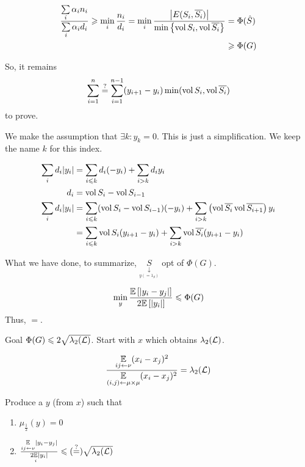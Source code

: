 \[
    \begin{aligned}
        \frac{\sum\limits_i \alpha_i n_i}{\sum\limits_i \alpha_i d_i} \geqslant \min\limits_i \frac{n_i}{d_i} = \min_i \frac{\left\lvert E(S_i,\overline{S_i})\right\rvert}{\min\left\{ \operatorname{vol} S_i,\operatorname{vol} \overline{S_i} \right\}} &= \Phi(\hat{S})\\
        &\geqslant \Phi(G)
    \end{aligned}
\]

So, it remains 
\[
    \sum\limits_{i=1}^n \overset{?}{=} \sum\limits_{i=1}^{n-1} (y_{i+1} - y_i) \min(\operatorname{vol} S_i, \operatorname{vol} \overline{S_i})
\]
to prove.



We make the assumption that $\exists k : y_k = 0$. This is just a simplification. We keep the name $k$ for this index.

\[
    \begin{aligned}
        \sum\limits_i d_i\lvert y_i \rvert &= \sum\limits_{i\leqslant k} d_i(-y_i) + \sum\limits_{i > k}d_i y_i\\
       d_i &= \operatorname{vol} S_i - \operatorname{vol} S_{i-1}\\
       \sum\limits_i d_i\lvert y_i \rvert &= \sum\limits_{i\leqslant k} (\operatorname{vol} S_i - \operatorname{vol} S_{i-1})(-y_i) + \sum\limits_{i>k} \left(\operatorname{vol} \overline{S_i} \operatorname{vol} \overline{S_{i+1}} \right)y_i\\
       &= \sum\limits_{i\leqslant k} \operatorname{vol} S_i (y_{i+1} -y_i) + \sum\limits_{i>k} \operatorname{vol} \overline{S_i} (y_{i+1} - y_i)
    \end{aligned}
\]

What we have done, to summarize, $\underset{\underset{y(=1_S)}{\downarrow}}{S}$ opt of $\Phi(G)$.

\[
    \min\limits_y \frac{\mathbb{E}\left[ \lvert y_i-y_j\rvert \right]}{2\mathbb{E}\left[ \lvert y_i \rvert \right]} \leqslant \Phi(G)
\]
Thus, $=$.

Goal $\Phi(G) \leqslant 2\sqrt{\lambda_2(\mathcal{L})}$. Start with $x$ which obtains $\lambda_2(\mathcal{L})$.

\[
    \frac{\underset{ij\leftarrow \nu}{\mathbb{E}}(x_i-x_j)^2}{\underset{(i,j)\leftarrow\mu\times\mu}{\mathbb{E}}(x_i-x_j)^2} = \lambda_2(\mathcal{L})
\]

Produce a $y$ (from $x$) such that
\begin{enumerate}[(1)]
    \item $\mu_{\frac{1}{2}}(y) = 0$
    \item $\frac{\underset{ij\leftarrow\nu}{\mathbb{E}}\lvert y_i-y_j\rvert}{2\underset{i}{\mathbb{E}}\lvert y_i \rvert} \leqslant (\overset{?}{=}) \sqrt{\lambda_2(\mathcal{L})}$
\end{enumerate}

